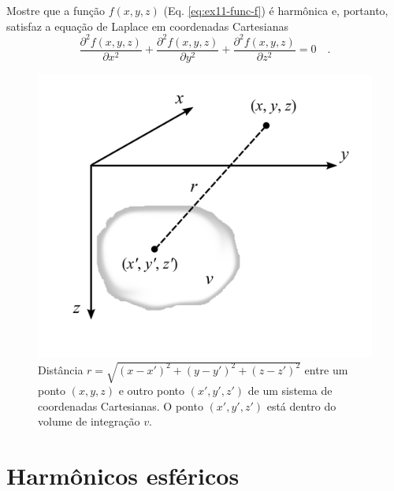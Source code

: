 \documentclass[10pt,a4paper,fleqn]{article}
\begin{document}
\begin{flushleft}
\dotfill
\end{flushleft}

Mostre que a funç\~{a}o $f(x,y,z)$ (Eq. \ref{eq:ex11-func-f}) \'{e} harm\^{o}nica e, portanto, satisfaz
a equaç\~{a}o de Laplace em coordenadas Cartesianas
\begin{equation}
\frac{\partial^{2} f(x,y,z)}{\partial x^{2}} +
\frac{\partial^{2} f(x,y,z)}{\partial y^{2}} +
\frac{\partial^{2} f(x,y,z)}{\partial z^{2}} = 0 \quad .
\label{eq:ex11-Laplace}
\end{equation}

\begin{flushleft}
\dotfill
\end{flushleft}

\begin{figure}[h]
    \centering
    \includegraphics[scale=1]{Figs/Fig1.png}
    \caption{Dist\^{a}ncia $r = \sqrt{(x-x')^{2}+(y-y')^{2}+(z-z')^{2}}$ entre
        um ponto $(x,y,z)$ e outro ponto $(x',y',z')$ de um sistema de coordenadas Cartesianas. O ponto
        $(x',y',z')$ est\'{a} dentro do volume de integraç\~{a}o $v$.}   
    \label{fig:fig1}
\end{figure}

\section{Harm\^{o}nicos esf\'{e}ricos}
\end{document}
